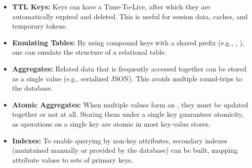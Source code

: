 \begin{itemize}
    \item \textbf{TTL Keys:} Keys can have a Time-To-Live, after which they are automatically expired and deleted. This is useful for session data, caches, and temporary tokens.
    \item \textbf{Emulating Tables:} By using compound keys with a shared prefix (e.g., , ), one can emulate the structure of a relational table.
    \item \textbf{Aggregates:} Related data that is frequently accessed together can be stored as a single value (e.g., serialized JSON). This avoids multiple round-trips to the database.
    \item \textbf{Atomic Aggregates:} When multiple values form an , they must be updated together or not at all. Storing them under a single key guarantees atomicity, as operations on a single key are atomic in most key-value stores.
    \item \textbf{Indexes:} To enable querying by non-key attributes, secondary indexes (maintained manually or provided by the database) can be built, mapping attribute values to sets of primary keys.
\end{itemize}

